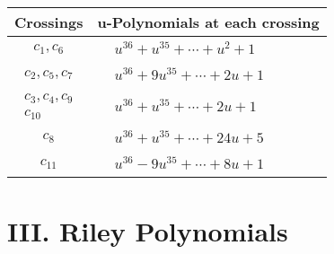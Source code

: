 \documentclass[1p]{elsarticle_modified}
\theoremstyle{definition}
\begin{document}
\begin{tabular}{m{50pt}|m{274pt}}
Crossings & \hspace{64pt}u-Polynomials at each crossing \\
\hline $$\begin{aligned}c_{1},c_{6}\end{aligned}$$&$\begin{aligned}
&u^{36}+u^{35}+\cdots+u^2+1
\end{aligned}$\\
\hline $$\begin{aligned}c_{2},c_{5},c_{7}\end{aligned}$$&$\begin{aligned}
&u^{36}+9 u^{35}+\cdots+2 u+1
\end{aligned}$\\
\hline $$\begin{aligned}c_{3},c_{4},c_{9}\\c_{10}\end{aligned}$$&$\begin{aligned}
&u^{36}+u^{35}+\cdots+2 u+1
\end{aligned}$\\
\hline $$\begin{aligned}c_{8}\end{aligned}$$&$\begin{aligned}
&u^{36}+u^{35}+\cdots+24 u+5
\end{aligned}$\\
\hline $$\begin{aligned}c_{11}\end{aligned}$$&$\begin{aligned}
&u^{36}-9 u^{35}+\cdots+8 u+1
\end{aligned}$\\
\hline
\end{tabular}\newpage\renewcommand{\arraystretch}{1}
\centering \section*{ III. Riley Polynomials}
\end{document}
